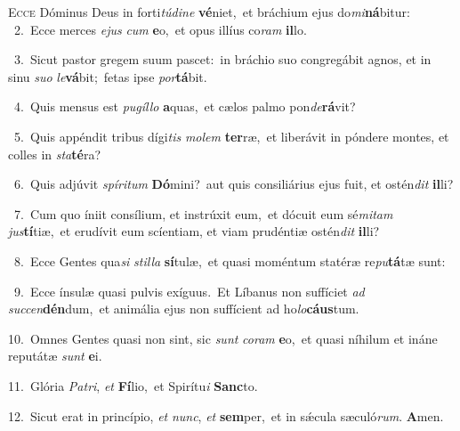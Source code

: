 \lettrine{\initial\textcolor{\initialcolor}{E}}{cce} Dóminus Deus in forti\-\textit{tú}\-\textit{di}\textit{ne} \textbf{vé}\-niet,~\star et bráchium ejus do\-\textit{mi}\-\textbf{ná}bitur:\\
{\numbfont\textcolor{\numbcolor}{~2.}}~Ecce merces \textit{e}\-\textit{jus} \textit{cum} \textbf{e}\-o,~\star et opus illíus co\textit{ram} \textbf{il}\-lo.\par
{\numbfont\textcolor{\numbcolor}{~3.}}~Sicut pastor gregem suum pascet:~\dagger in bráchio suo congregábit agnos, et in sinu \textit{su}\-\textit{o} \textit{le}\-\textbf{vá}bit;~\star fetas ipse \textit{por}\-\textbf{tá}bit.\par
{\numbfont\textcolor{\numbcolor}{~4.}}~Quis mensus est \textit{pu}\-\textit{gíl}\textit{lo} \textbf{a}\-quas,~\star et cælos palmo pon\-\textit{de}\-\textbf{rá}vit?\par
{\numbfont\textcolor{\numbcolor}{~5.}}~Quis appéndit tribus dígi\textit{tis} \textit{mo}\-\textit{lem} \textbf{ter}\-ræ,~\star et liberávit in póndere montes, et colles in \textit{sta}\-\textbf{té}ra?\par
{\numbfont\textcolor{\numbcolor}{~6.}}~Quis adjúvit \textit{spí}\-\textit{ri}\textit{tum} \textbf{Dó}\-mini?~\star aut quis consiliárius ejus fuit, et ostén\textit{dit} \textbf{il}\-li?\par
{\numbfont\textcolor{\numbcolor}{~7.}}~Cum quo íniit consílium, et instrúxit eum,~\dagger et dócuit eum sé\-\textit{mi}\-\textit{tam} \textit{jus}\-\textbf{tí}tiæ,~\star et erudívit eum scíentiam, et viam prudéntiæ ostén\textit{dit} \textbf{il}\-li?\par
{\numbfont\textcolor{\numbcolor}{~8.}}~Ecce Gentes qua\textit{si} \textit{stil}\-\textit{la} \textbf{sí}\-tulæ,~\star et quasi moméntum statéræ re\-\textit{pu}\-\textbf{tá}tæ sunt:\par
{\numbfont\textcolor{\numbcolor}{~9.}}~Ecce ínsulæ quasi pulvis exíguus.~\dagger Et Líbanus non suffíciet \textit{ad} \textit{suc}\-\textit{cen}\textbf{dén}dum,~\star et animália ejus non suffícient ad ho\-\textit{lo}\-\textbf{cáus}tum.\par
{\numbfont\textcolor{\numbcolor}{10.}}~Omnes Gentes quasi non sint, sic \textit{sunt} \textit{co}\-\textit{ram} \textbf{e}\-o,~\star et quasi níhilum et ináne reputátæ \textit{sunt} \textbf{e}\-i.\par
{\numbfont\textcolor{\numbcolor}{11.}}~Glória \textit{Pa}\-\textit{tri}, \textit{et} \textbf{Fí}\-lio,~\star et Spirítu\textit{i} \textbf{Sanc}\-to.\par
{\numbfont\textcolor{\numbcolor}{12.}}~Sicut erat in princípio, \textit{et} \textit{nunc}\-, \textit{et} \textbf{sem}\-per,~\star et in sǽcula sæculó\-\textit{rum}\-. \textbf{A}\-men.\par
